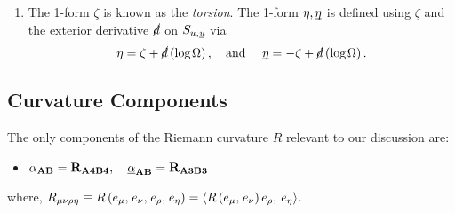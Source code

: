 \documentclass[12pt, a4paper]{report}
\theoremstyle{bfnote}
\newcommand{\underit}[1]{\textit{\underbar{#1}}}
\begin{document}
\begin{enumerate}[leftmargin=*, label={\bfseries{(\roman*)}}]
    \item The 1-form $\zeta$ is known as the \textit{torsion}. The 1-form $\eta,
    \underit{$\eta$}$ is defined using $\zeta$ and the exterior derivative
    $\cancel{d}$ on $S_{u, \underit{u}}$ via
    \begin{equation*}
        \eta = \zeta + \cancel{d}\left(\mathrm{log}\hspace{0.1em}\Omega\right), \quad \text{and } \quad \underit{$\eta$} = -\zeta + \cancel{d}\left(\mathrm{log}\hspace{0.1em}\Omega\right).
    \end{equation*}          
\end{enumerate}

\subsection{Curvature Components}
The only components of the Riemann curvature $R$ relevant to our discussion are:
\begin{itemize}
    \item $\mathbf{\alpha_{AB} = R_{A4B4}, \quad \underit{$\alpha$}_{AB} = R_{A3B3}}$
\end{itemize}
where, $R_{\mu\nu\rho\eta} \equiv R\left(e_\mu, \hspace{0.1em}e_\nu, \hspace{0.1em}e_\rho, \hspace{0.1em}e_\eta\right) = \left\langle R\left(e_\mu, \hspace{0.1em}e_\nu\right)e_\rho, \hspace{0.2em}e_\eta\right\rangle$.
\end{document}
